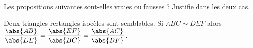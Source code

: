 %
%
    Les propositions suivantes sont-elles vraies ou fausses ? Justifie dans les deux cas.
    \begin{tasks}
        \task Deux triangles rectangles isocèles sont semblables.
        \task Si \(ABC \sim DEF\) alors \(\dfrac{\abs{AB}}{\abs{DE}} = \dfrac{\abs{EF}}{\abs{BC}} = \dfrac{\abs{AC}}{\abs{DF}}\).
    \end{tasks}

